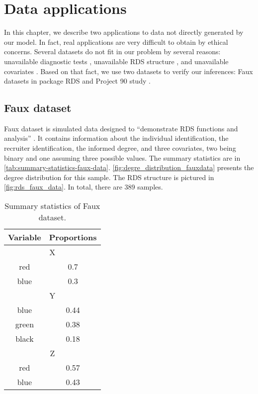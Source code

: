 \chapter{Data applications}
\label{ch:real_data_applications}

In this chapter, we describe two applications to data not directly generated
by our model. In fact, real applications are very difficult to obtain by
ethical concerns. Several datasets do not fit in our problem by
several reasons: unavailable diagnostic tests \cite{perestroika2021sexual,
khoury2020hard, salganik2011assessing}, unavailable RDS structure
\cite{coutinho2019risks, kendall201912}, and unavailable covariates
\cite{wu2017using}. Based on that fact, we use two datasets to verify our
inferences: Faux datasets in package RDS \cite{rds_package} and Project 90
study \cite{project90}.

\section{Faux dataset}

Faux dataset is simulated data designed to ``demonstrate RDS functions and
analysis'' \cite[p. 15]{rds_package}. It contains information about the
individual identification, the recruiter identification, the informed degree,
and three covariates, two being binary and one assuming three possible values.
The summary statistics are in \autoref{tab:summary-statistics-faux-data}.
\autoref{fig:degre_distribution_fauxdata} presents the degree distribution for
this sample. The RDS structure is pictured in \autoref{fig:rds_faux_data}. In
total, there are 389 samples. 

\begin{table}[htbp]
    \centering
    \caption{\label{tab:summary-statistics-faux-data}Summary statistics of
    Faux dataset.}
    \begin{tabular}{cc}
    \hline
    Variable & Proportions \\ \hline
    \multicolumn{2}{c}{X} \\ \hline
    red & 0.7 \\
    blue & 0.3 \\ \hline
    \multicolumn{2}{c}{Y} \\ \hline
    blue & 0.44 \\
    green & 0.38 \\
    black & 0.18 \\ \hline
    \multicolumn{2}{c}{Z} \\ \hline
    red & 0.57 \\
    blue & 0.43 \\ \hline
    \end{tabular}
\end{table}

